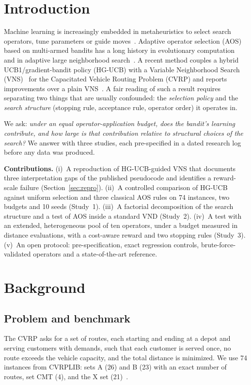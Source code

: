 \documentclass[conference]{IEEEtran}
\begin{document}
\section{Introduction}
Machine learning is increasingly embedded in metaheuristics to select search operators, tune parameters or guide moves~\cite{karimimamaghan2022}. Adaptive operator selection (AOS) based on multi-armed bandits has a long history in evolutionary computation~\cite{fialho2010,thierens2005} and in adaptive large neighborhood search~\cite{ropke2006}. A recent method couples a hybrid UCB1/gradient-bandit policy (HG-UCB) with a Variable Neighborhood Search (VNS)~\cite{hansen2001} for the Capacitated Vehicle Routing Problem (CVRP) and reports improvements over a plain VNS~\cite{kalatzantonakis2023}. A fair reading of such a result requires separating two things that are usually confounded: the \emph{selection policy} and the \emph{search structure} (stopping rule, acceptance rule, operator order) it operates in.

We ask: \emph{under an equal operator-application budget, does the bandit's learning contribute, and how large is that contribution relative to structural choices of the search?} We answer with three studies, each pre-specified in a dated research log before any data was produced.

\textbf{Contributions.}
(i)~A reproduction of HG-UCB-guided VNS that documents three interpretation gaps of the published pseudocode and identifies a reward-scale failure (Section~\ref{sec:repro}).
(ii)~A controlled comparison of HG-UCB against uniform selection and three classical AOS rules on 74 instances, two budgets and 10 seeds (Study~1).
(iii)~A factorial decomposition of the search structure and a test of AOS inside a standard VND (Study~2).
(iv)~A test with an extended, heterogeneous pool of ten operators, under a budget measured in distance evaluations, with a cost-aware reward and two stopping rules (Study~3).
(v)~An open protocol: pre-specification, exact regression controls, brute-force-validated operators and a state-of-the-art reference. %

\section{Background}
\subsection{Problem and benchmark}
The CVRP asks for a set of routes, each starting and ending at a depot and serving customers with demands, such that each customer is served once, no route exceeds the vehicle capacity, and the total distance is minimized. We use 74 instances from CVRPLIB: sets A (26) and B (23) with an exact number of routes, set CMT (4), and the X set (21)~\cite{uchoa2017}. %
\end{document}
